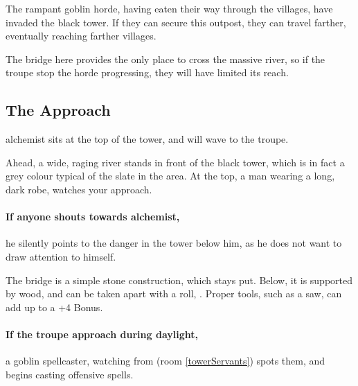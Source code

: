 \begin{multicols}{2}


\begin{exampletext}
  \noindent
  The rampant goblin horde, having eaten their way through the \glspl{village}, have invaded the black tower.
  If they can secure this outpost, they can travel farther, eventually reaching farther \glspl{village}.

  The bridge here provides the only place to cross the massive river, so if the troupe stop the horde progressing, they will have limited its reach.
\end{exampletext}

\subsection{The Approach}

\Gls{alchemist} sits at the top of the tower, and will wave to the troupe.

\begin{boxtext}

  Ahead, a wide, raging river stands in front of the black tower, which is in fact a grey colour typical of the slate in the area.
  At the top, a man wearing a long, dark robe, watches your approach.

\end{boxtext}

\paragraph{If anyone shouts towards \gls{alchemist},}
he silently points to the danger in the tower below him, as he does not want to draw attention to himself.


The bridge is a simple stone construction, which stays put.
Below, it is supported by wood, and can be taken apart with a  roll, \tn[14].
Proper tools, such as a saw, can add up to a +4 Bonus.

\paragraph{If the troupe approach during daylight,}
a goblin spellcaster, watching from  (room \ref{towerServants}) spots them, and begins casting offensive spells.


\end{multicols}
